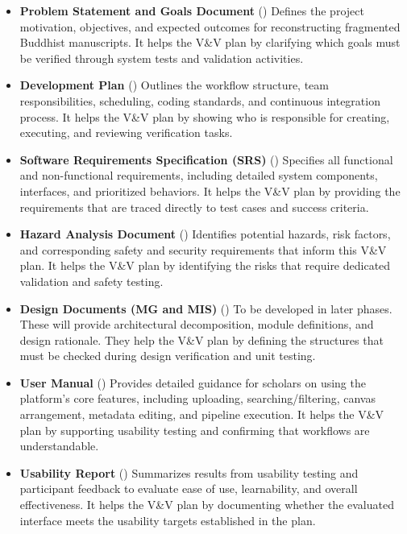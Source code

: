 \documentclass[12pt, titlepage]{article}
\begin{document}
\begin{itemize}
    \item \textbf{Problem Statement and Goals Document} (\citet{ProblemStatement})  
  Defines the project motivation, objectives, and expected outcomes for reconstructing fragmented Buddhist manuscripts. It helps the V\&V plan by clarifying which goals must be verified through system tests and validation activities.

    \item \textbf{Development Plan} (\citet{DevelopmentPlan})  
  Outlines the workflow structure, team responsibilities, scheduling, coding standards, and continuous integration process. It helps the V\&V plan by showing who is responsible for creating, executing, and reviewing verification tasks.

    \item \textbf{Software Requirements Specification (SRS)} (\citet{SRS-Sanskrit-Ciphers})  
  Specifies all functional and non-functional requirements, including detailed system components, interfaces, and prioritized behaviors. It helps the V\&V plan by providing the requirements that are traced directly to test cases and success criteria.

    \item \textbf{Hazard Analysis Document} (\citet{HazardAnalysis})  
  Identifies potential hazards, risk factors, and corresponding safety and security requirements that inform this V\&V plan. It helps the V\&V plan by identifying the risks that require dedicated validation and safety testing.

    \item \textbf{Design Documents (MG and MIS)} (\citet{DesignDocs})  
  To be developed in later phases. These will provide architectural decomposition, module definitions, and design rationale. They help the V\&V plan by defining the structures that must be checked during design verification and unit testing.

    \item \textbf{User Manual} (\citet{UserManual})  
  Provides detailed guidance for scholars on using the platform’s core features, including uploading, searching/filtering, canvas arrangement, metadata editing, and pipeline execution. It helps the V\&V plan by supporting usability testing and confirming that workflows are understandable.

    \item \textbf{Usability Report} (\citet{UsabilityReport})  
  Summarizes results from usability testing and participant feedback to evaluate ease of use, learnability, and overall effectiveness. It helps the V\&V plan by documenting whether the evaluated interface meets the usability targets established in the plan.
\end{itemize}
\end{document}
